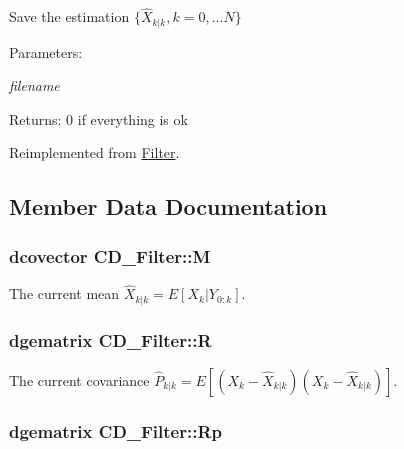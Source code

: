 Save the estimation $ \{ \hat{X}_{k|k} ,k=0,...N \} $

\begin{Desc}
\item[Parameters:]
\begin{description}
\item[{\em filename}]\end{description}
\end{Desc}
\begin{Desc}
\item[Returns:]0 if everything is ok \end{Desc}


Reimplemented from \hyperlink{class_filter_0b7aad4b130b176f423b7f1c0c30a887}{Filter}.

\subsection{Member Data Documentation}
\hypertarget{class_c_d___filter_1388124f777df49de87fa59058535cde}{
\subsubsection[{M}]{\setlength{\rightskip}{0pt plus 5cm}dcovector {\bf CD\_\-Filter::M}}}
\label{class_c_d___filter_1388124f777df49de87fa59058535cde}


The current mean $ \hat{X}_{k|k}=E[X_k |Y_{0:k}] $. 

\hypertarget{class_c_d___filter_7a359404418fc49bf7a038ac27cc579b}{
\subsubsection[{R}]{\setlength{\rightskip}{0pt plus 5cm}dgematrix {\bf CD\_\-Filter::R}}}
\label{class_c_d___filter_7a359404418fc49bf7a038ac27cc579b}


The current covariance $ \hat{P}_{k|k}=E[(X_k-\hat{X}_{k|k})(X_k-\hat{X}_{k|k})] $. 

\hypertarget{class_c_d___filter_76bc9c00c330ffaa2815f073158353f3}{
\subsubsection[{Rp}]{\setlength{\rightskip}{0pt plus 5cm}dgematrix {\bf CD\_\-Filter::Rp}}}
\label{class_c_d___filter_76bc9c00c330ffaa2815f073158353f3}


